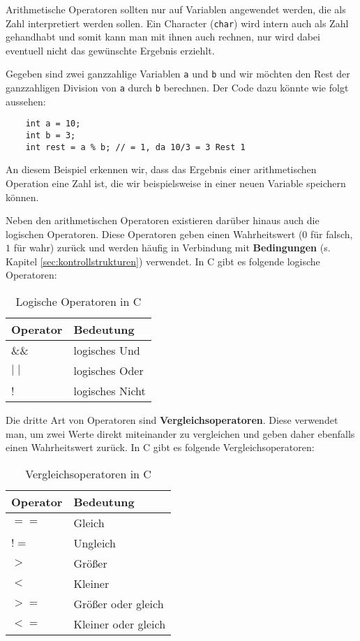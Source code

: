 \documentclass[11pt]{article}
\begin{document}
\begin{anmk}
  Arithmetische Operatoren sollten nur auf Variablen angewendet werden, die als Zahl interpretiert werden sollen. Ein
  Character (\texttt{char}) wird intern auch als Zahl gehandhabt und somit kann man mit ihnen auch rechnen, nur wird
  dabei eventuell nicht das gewünschte Ergebnis erziehlt.
\end{anmk}

\begin{bsp}
  Gegeben sind zwei ganzzahlige Variablen \texttt{a} und \texttt{b} und wir möchten den Rest der ganzzahligen Division 
  von \texttt{a} durch \texttt{b} berechnen. Der Code dazu könnte wie folgt aussehen:
  \begin{verbatim}
    int a = 10;
    int b = 3;
    int rest = a % b; // = 1, da 10/3 = 3 Rest 1
  \end{verbatim}

  An diesem Beispiel erkennen wir, dass das Ergebnis einer arithmetischen Operation eine Zahl ist, die wir beispielsweise
  in einer neuen Variable speichern können.
\end{bsp}

Neben den arithmetischen Operatoren existieren darüber hinaus auch die logischen Operatoren. Diese Operatoren geben 
einen Wahrheitswert ($0$ für falsch, $1$ für wahr) zurück und werden häufig in Verbindung mit \textbf{Bedingungen} 
(s. Kapitel \ref{sec:kontrollstrukturen}) verwendet. In C gibt es folgende logische Operatoren:

\begin{table}[h!]
  \centering
  \begin{tabular}{@{}ll@{}}
    \toprule
    Operator   & Bedeutung       \\ \midrule
    \&\&       & logisches Und   \\
    $\mid\mid$ & logisches Oder  \\
    !          & logisches Nicht \\ \bottomrule
  \end{tabular}
  \caption{Logische Operatoren in C}
\end{table}

Die dritte Art von Operatoren sind \textbf{Vergleichsoperatoren}. Diese verwendet man, um zwei Werte direkt miteinander
zu vergleichen und geben daher ebenfalls einen Wahrheitswert zurück. In C gibt es folgende Vergleichsoperatoren:
\begin{table}[h!]
  \centering
  \begin{tabular}{@{}ll@{}}
    \toprule
    Operator & Bedeutung           \\ \midrule
    $==$     & Gleich              \\
    $!=$     & Ungleich            \\
    $>$      & Größer              \\
    $<$      & Kleiner             \\
    $>=$     & Größer oder gleich  \\
    $<=$     & Kleiner oder gleich \\ \bottomrule
  \end{tabular}
  \caption{Vergleichsoperatoren in C}
\end{table}
\end{document}
